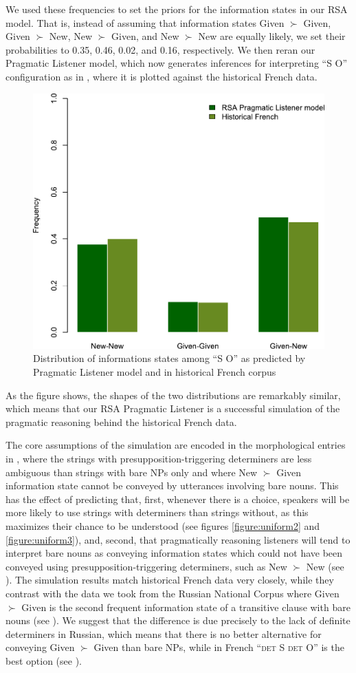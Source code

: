 \documentclass[output=paper,modfonts,nonflat]{langsci/langscibook}
\begin{document}
We used these frequencies to set the priors for the information states in our RSA model. That is, instead of assuming that information states Given $\succ$ Given, Given $\succ$ New, New $\succ$ Given, and New $\succ$ New are equally likely, we set their probabilities to 0.35, 0.46, 0.02, and 0.16, respectively. We then reran our Pragmatic Listener model, which now generates inferences for interpreting  ``S O'' configuration as in , where it is plotted against the historical French data.

\begin{figure}
\includegraphics[width=.666\textwidth]{figures/plotModelComparison}
\caption{Distribution of informations states among  ``S O'' as predicted by Pragmatic Listener model and in historical French corpus}\label{figure:models}
\end{figure}

As the figure shows, the shapes of the two distributions are remarkably similar, which means that our RSA Pragmatic Listener is a successful simulation of the pragmatic reasoning behind the historical French data.

The core assumptions of the simulation are encoded in the morphological entries in , where the strings with presupposition-triggering determiners are less ambiguous than strings with bare NPs only and where New $\succ$ Given information state cannot be conveyed by utterances involving bare nouns. This has the effect of predicting that, first, whenever there is a choice, speakers will be more likely to use strings with determiners than strings without, as this maximizes their chance to be understood (see figures \ref{figure:uniform2} and \ref{figure:uniform3}), and, second, that pragmatically reasoning listeners will tend to interpret bare nouns as conveying information states which could not have been conveyed using presupposition-triggering determiners, such as New $\succ$ New (see ). The simulation results match historical French data very closely, while they contrast with the data we took from the Russian National Corpus where Given $\succ$ Given is the second frequent information state of a transitive clause with bare nouns (see ). We suggest that the difference is due precisely to the lack of definite determiners in Russian, which means that there is no better alternative for conveying Given $\succ$ Given than bare NPs, while in French  ``{\scshape det} S {\scshape det} O'' is the best option (see ).
\end{document}
